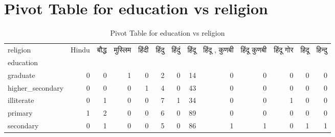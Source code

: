 \documentclass{article}
\begin{document}
\section{Pivot Table for education vs religion}
\begin{table}
\caption{Pivot Table for education vs religion}
\label{tab:education_religion}
\begin{tabular}{lrrrrrrrrrrrr}
\toprule
religion & Hindu & बौद्ध & मुस्लिम & हिंदी & हिंदु & हिंदुं & हिंदू & हिंदू , कुणबी & हिंदू कुणबी & हिंदू गोर & हिदू & हिन्दु \\
education &  &  &  &  &  &  &  &  &  &  &  &  \\
\midrule
graduate & 0 & 0 & 1 & 0 & 2 & 0 & 14 & 0 & 0 & 0 & 0 & 0 \\
higher\_secondary & 0 & 0 & 0 & 1 & 4 & 0 & 43 & 0 & 0 & 0 & 0 & 0 \\
illiterate & 0 & 1 & 0 & 0 & 7 & 1 & 34 & 0 & 0 & 1 & 0 & 0 \\
primary & 1 & 2 & 0 & 0 & 6 & 0 & 89 & 0 & 0 & 0 & 0 & 0 \\
secondary & 0 & 1 & 0 & 0 & 5 & 0 & 86 & 1 & 1 & 0 & 1 & 1 \\
\bottomrule
\end{tabular}
\end{table}
\end{document}
